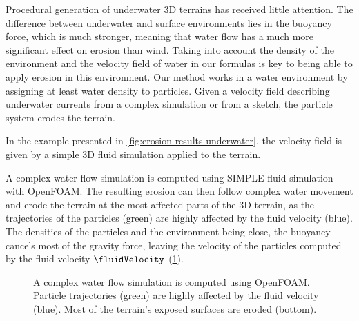 Procedural generation of underwater 3D terrains has received little attention. The difference between underwater and surface environments lies in the buoyancy force, which is much stronger, meaning that water flow has a much more significant effect on erosion than wind. Taking into account the density of the environment and the velocity field of water in our formulas is key to being able to apply erosion in this environment.  
Our method works in a water environment by assigning at least water density to particles. Given a velocity field describing underwater currents from a complex simulation or from a sketch, the particle system erodes the terrain. 

In the example presented in \cref{fig:erosion-results-underwater}, the velocity field is given by a simple 3D fluid simulation \cite{Stam1999} applied to the terrain. %

A complex water flow simulation is computed using SIMPLE \cite{Caretto1973} fluid simulation with OpenFOAM. The resulting erosion can then follow complex water movement and erode the terrain at the most affected parts of the 3D terrain, as the trajectories of the particles (green) are highly affected by the fluid velocity (blue). The densities of the particles and the environment being close, the buoyancy cancels most of the gravity force, leaving the velocity of the particles computed by the fluid velocity $\fluidVelocity$ (\cref{fig:erosion-underwater_result}). %

\begin{figure}
    \caption{A complex water flow simulation is computed using OpenFOAM. Particle trajectories (green) are highly affected by the fluid velocity (blue). Most of the terrain's exposed surfaces are eroded (bottom).}
    \label{fig:erosion-underwater_result}
\end{figure}



